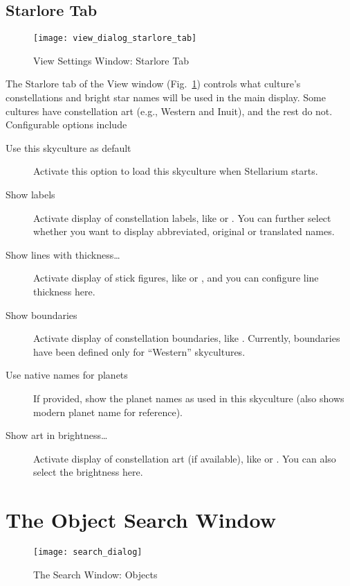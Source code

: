 \subsection{Starlore Tab}
\label{sec:gui:view:starlore}

\begin{figure}[t]
\centering\texttt{[image: view\_dialog\_starlore\_tab]}
\caption{View Settings Window: Starlore Tab}
\label{fig:gui:view:starlore}
\end{figure}

The Starlore tab of the View window (Fig.~\ref{fig:gui:view:starlore})
controls what culture's constellations and bright star names will be
used in the main display.  Some cultures have constellation art (e.g.,
Western and Inuit), and the rest do not. Configurable options include
\begin{description}
\item[Use this skyculture as default] Activate this option to load
  this skyculture when Stellarium starts.
\item[Show labels] Activate display of constellation labels, like
   or . You can further
  select whether you want to display abbreviated, original or
  translated names.
\item[Show lines with thickness\ldots] Activate display of stick
  figures, like  or , and you
  can configure line thickness here.
\item[Show boundaries] Activate display of constellation boundaries,
  like . Currently, boundaries have been defined only for
  ``Western'' skycultures.
\item[Use native names for planets] If provided, show the planet names
  as used in this skyculture (also shows modern planet name for
  reference). %
\item[Show art in brightness\ldots] Activate display of constellation
  art (if available), like  or
  . You can also select the brightness here.
\end{description}


\section{The Object Search Window}
\label{sec:gui:search}

\begin{figure}[p]
\centering\texttt{[image: search\_dialog]}
\caption{The Search Window: Objects}
\label{fig:gui:search}
\end{figure}

